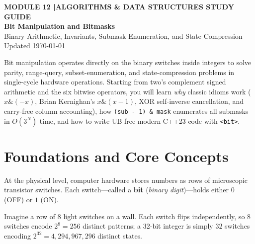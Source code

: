 \documentclass[11pt,a4paper]{article}
\newcommand{\sectionbreak}{}
\theoremstyle{definition}
\begin{document}
\thispagestyle{plain}
\begin{tcolorbox}[
    enhanced,
    colback=primaryblue!6, colframe=primaryblue!20,
    borderline west={5pt}{0pt}{primaryblue},
    arc=4pt, boxrule=0.6pt,
    left=14pt, right=14pt, top=7pt, bottom=7pt,
    before skip=0pt, after skip=5pt
]
    {\footnotesize\bfseries\color{accentteal}MODULE 12 \quad|\quad ALGORITHMS \& DATA STRUCTURES STUDY GUIDE}\\[3pt]
    {\Huge\bfseries\color{primaryblue}Bit Manipulation and Bitmasks}\\[3pt]
    {\large\color{codegray}Binary Arithmetic, Invariants, Submask Enumeration, and State Compression}\\[4pt]
    {\footnotesize\color{codegray}Updated \today}
\end{tcolorbox}

\begin{overviewbox}
Bit manipulation operates directly on the binary switches inside integers to solve parity, range-query, subset-enumeration, and state-compression problems in single-cycle hardware operations. Starting from two's complement signed arithmetic and the six bitwise operators, you will learn \emph{why} classic idioms work ($x \mathbin{\&} (-x)$, Brian Kernighan's $x \mathbin{\&} (x-1)$, XOR self-inverse cancellation, and carry-free column accounting), how \texttt{(sub - 1) \& mask} enumerates all submasks in $O(3^N)$ time, and how to write UB-free modern C++23 code with \texttt{<bit>}.
\end{overviewbox}

\vspace{-5pt}
{\setlength{\parskip}{0pt}\footnotesize\tableofcontents}

\renewcommand{\sectionbreak}{\clearpage}

\section{Foundations and Core Concepts}

At the physical level, computer hardware stores numbers as rows of microscopic transistor switches. Each switch---called a \textbf{bit} (\emph{binary digit})---holds either $0$ (OFF) or $1$ (ON).

Imagine a row of $8$ light switches on a wall. Each switch flips independently, so $8$ switches encode $2^8 = 256$ distinct patterns; a 32-bit integer is simply $32$ switches encoding $2^{32} = 4{,}294{,}967{,}296$ distinct states.
\end{document}
